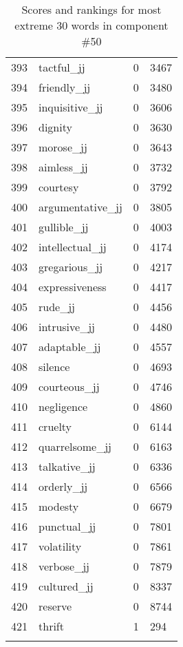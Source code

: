 \begin{longtable}[!htbp]{| rlr@{.}l |}
    393 & tactful\_jj & 0 & 3467 \\
    394 & friendly\_jj & 0 & 3480 \\
    395 & inquisitive\_jj & 0 & 3606 \\
    396 & dignity & 0 & 3630 \\
    397 & morose\_jj & 0 & 3643 \\
    398 & aimless\_jj & 0 & 3732 \\
    399 & courtesy & 0 & 3792 \\
    400 & argumentative\_jj & 0 & 3805 \\
    401 & gullible\_jj & 0 & 4003 \\
    402 & intellectual\_jj & 0 & 4174 \\
    403 & gregarious\_jj & 0 & 4217 \\
    404 & expressiveness & 0 & 4417 \\
    405 & rude\_jj & 0 & 4456 \\
    406 & intrusive\_jj & 0 & 4480 \\
    407 & adaptable\_jj & 0 & 4557 \\
    408 & silence & 0 & 4693 \\
    409 & courteous\_jj & 0 & 4746 \\
    410 & negligence & 0 & 4860 \\
    411 & cruelty & 0 & 6144 \\
    412 & quarrelsome\_jj & 0 & 6163 \\
    413 & talkative\_jj & 0 & 6336 \\
    414 & orderly\_jj & 0 & 6566 \\
    415 & modesty & 0 & 6679 \\
    416 & punctual\_jj & 0 & 7801 \\
    417 & volatility & 0 & 7861 \\
    418 & verbose\_jj & 0 & 7879 \\
    419 & cultured\_jj & 0 & 8337 \\
    420 & reserve & 0 & 8744 \\
    421 & thrift & 1 & 294 \\
    \hline
    \caption{Scores and rankings for most extreme 30 words in component \#50} \\
\end{longtable}
